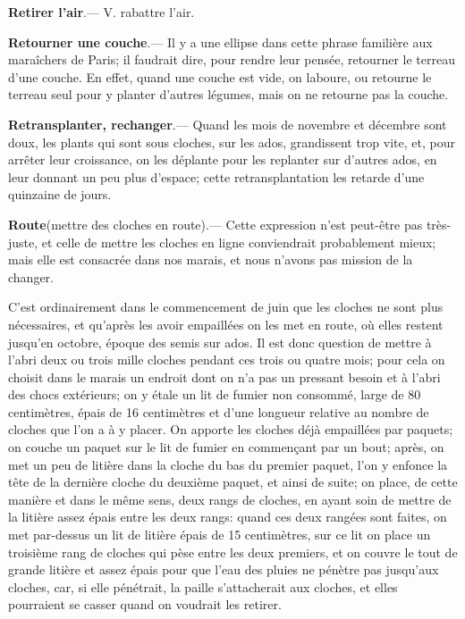 \documentclass[10pt,a4paper]{book}
\begin{document}
\textbf{Retirer l'air}.--- V. rabattre l'air.

\textbf{Retourner une couche}.--- Il y a une ellipse dans cette phrase familière aux maraîchers de Paris; il faudrait dire, pour rendre leur pensée, retourner le terreau d'une couche. En effet, quand une couche est vide, on laboure, ou retourne le terreau seul pour y planter d'autres légumes, mais on ne retourne pas la couche.

\textbf{Retransplanter, rechanger}.--- Quand les mois de novembre et décembre sont doux, les plants qui sont sous cloches, sur les ados, grandissent trop vite, et, pour arrêter leur croissance, on les déplante pour les replanter sur d'autres ados, en leur donnant un peu plus d'espace; cette retransplantation les retarde d'une quinzaine de jours.

\textbf{Route}\label{route}(mettre des cloches en route).--- Cette expression n'est peut-être pas très-juste, et celle de mettre les cloches en ligne conviendrait probablement mieux; mais elle est consacrée dans nos marais, et nous n'avons pas mission de la changer.

C'est ordinairement dans le commencement de juin que les cloches ne sont plus nécessaires, et qu'après les avoir empaillées on les met en route, où elles restent jusqu'en octobre, époque des semis sur ados. Il est donc question de mettre à l'abri deux ou trois mille cloches pendant ces trois ou quatre mois; pour cela on choisit dans le marais un endroit dont on n'a pas un pressant besoin et à l'abri des chocs extérieurs; on y étale un lit de fumier non consommé, large de 80 centimètres, épais de 16 centimètres et d'une longueur relative au nombre de cloches que l'on a à y placer. On apporte les cloches déjà empaillées par paquets; on couche un paquet sur le lit de fumier en commençant par un bout; après, on met un peu de litière dans la cloche du bas du premier paquet, l'on y enfonce la tête de la dernière cloche du deuxième paquet, et ainsi de suite; on place, de cette manière et dans le même sens, deux rangs de cloches, en ayant soin de mettre de la litière assez épais entre les deux rangs: quand ces deux rangées sont faites, on met par-dessus un lit de litière épais de 15 centimètres, sur ce lit on place un troisième rang de cloches qui pèse entre les deux premiers, et on couvre le tout de grande litière et assez épais pour que l'eau des pluies ne pénètre pas jusqu'aux cloches, car, si elle pénétrait, la paille s'attacherait aux cloches, et elles pourraient se casser quand on voudrait les retirer.
\end{document}
